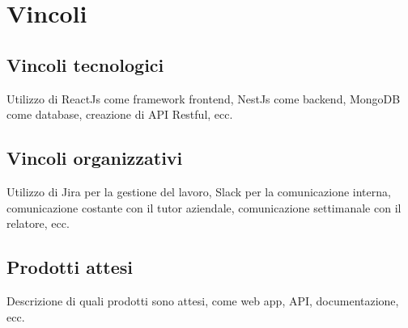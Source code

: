 \section{Vincoli}
\label{sez:vincoli}

\subsection{Vincoli tecnologici}
\label{subsec:vincoli-tecnologici}

Utilizzo di ReactJs come framework frontend, NestJs come backend, MongoDB come database, creazione di API Restful, ecc.

\subsection{Vincoli organizzativi}
\label{subsec:vincoli-organizzativi}

Utilizzo di Jira per la gestione del lavoro, Slack per la comunicazione interna, comunicazione costante con il tutor aziendale, comunicazione settimanale con il relatore, ecc.

\subsection{Prodotti attesi}
\label{sez:prodotti-attesi}

Descrizione di quali prodotti sono attesi, come web app, API, documentazione, ecc.\\